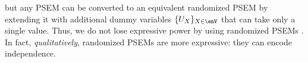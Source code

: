 but
any PSEM can be
converted to an equivalent randomized PSEM by extending it 
with additional dummy variables $\{U_X\}_{X \in \enV}$ that can
take only a single value. 
%
%
Thus, we do not lose expressive power by using randomized PSEMs
\unskip. In fact, \emph{qualitatively}, 
randomized PSEMs are more expressive: they can encode independence.

